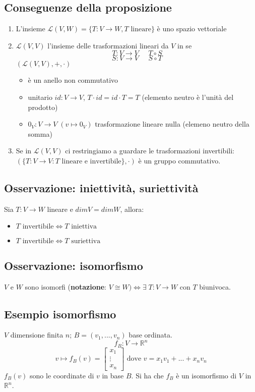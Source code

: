 \subsection{Conseguenze della proposizione}
\begin{enumerate}[label=\alph*)]
	\item L'insieme $\mathcal{L}(V,W)=\{T:V\rightarrow W, T \text{ lineare}\}$ è uno spazio vettoriale
	\item $\mathcal{L}(V,V)$ l'insieme delle trasformazioni lineari da $V$ in se
	\[T:V\rightarrow V\;\;\;\;\;T\circ S\]
	\[S:V\rightarrow V\;\;\;\;\;S\circ T\]
	$(\mathcal{L}(V,V),+,\cdot)$
	\begin{itemize}
		\item è un anello non commutativo
		\item unitario $id:V\rightarrow V$, $T\cdot id=id\cdot T=T$ (elemento neutro è l'unità del prodotto)
		\item $0_V:V\rightarrow V\;(v\mapsto 0_V)$ trasformazione lineare nulla (elemeno neutro della somma)
	\end{itemize}
	\item Se in $\mathcal{L}(V,V)$ ci restringiamo a guardare le trasformazioni invertibili:
	\\$(\{T:V\rightarrow V:T\text{ lineare e invertibile}\},\cdot)$ è un gruppo commutativo.
\end{enumerate}

\subsection{Osservazione: iniettività, suriettività}
Sia $T:V\rightarrow W$ lineare e $dimV=dimW$, allora:
\begin{itemize}
	\item $T\text{ invertibile}\Leftrightarrow T\text{ iniettiva}$
	\item $T\text{ invertibile}\Leftrightarrow T\text{ suriettiva}$
\end{itemize}

\subsection{Osservazione: isomorfismo}
$V$ e $W$ sono isomorfi (\textbf{notazione}: $V\cong W)\Leftrightarrow\exists\;T:V\rightarrow W$ con $T$ biunivoca. 

\subsection{Esempio isomorfismo}
$V$ dimensione finita $n$; $B=(v_1,...,v_n)$ base ordinata.
\[f_B:V\rightarrow\mathbb{R}^n\]
\[v\mapsto f_B(v)=\begin{bmatrix}x_1\\\vdots\\x_n\end{bmatrix}\text{ dove }v=x_1v_1+...+x_nv_n\]
$f_B(v)$ sono le coordinate di $v$ in base $B$. Si ha che $f_B$ è un isomorfismo di $V$ in $\mathbb{R}^n$.

